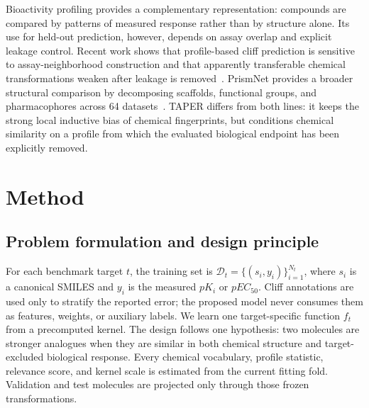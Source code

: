 \documentclass[manuscript,nonacm]{acmart}
\newcommand{\method}{TAPER\xspace}
\begin{document}
Bioactivity profiling provides a complementary representation: compounds are
compared by patterns of measured response rather than by structure alone. Its
use for held-out prediction, however, depends on assay overlap and explicit
leakage control. Recent work shows that profile-based cliff prediction is
sensitive to assay-neighborhood construction and that apparently transferable
chemical transformations weaken after leakage is removed~\cite{bioactivityprofiles,kinasecliffs}.
PrismNet provides a broader structural comparison by decomposing scaffolds,
functional groups, and pharmacophores across 64 datasets~\cite{prismnet}.
\method differs from both lines: it keeps the strong local inductive bias of
chemical fingerprints, but conditions chemical similarity on a profile from
which the evaluated biological endpoint has been explicitly removed.

\section{Method}
\subsection{Problem formulation and design principle}
For each benchmark target $t$, the training set is
$\mathcal{D}_t=\{(s_i,y_i)\}_{i=1}^{N_t}$, where $s_i$ is a canonical SMILES
and $y_i$ is the measured $pK_i$ or $pEC_{50}$. Cliff annotations are used only
to stratify the reported error; the proposed model never consumes them as
features, weights, or auxiliary labels. We learn one target-specific function
$f_t$ from a precomputed kernel. The design follows one hypothesis: two
molecules are stronger analogues when they are similar in both chemical
structure and target-excluded biological response. Every chemical vocabulary,
profile statistic, relevance score, and kernel scale is estimated from the
current fitting fold. Validation and test molecules are projected only through
those frozen transformations.
\end{document}
